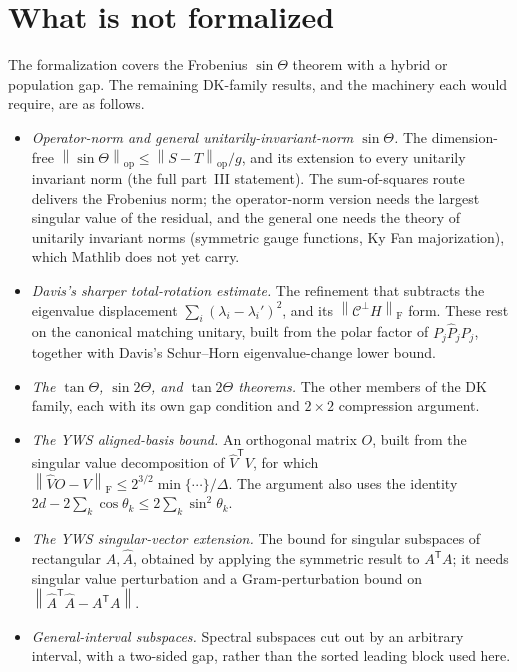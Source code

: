 \documentclass[11pt]{article}
\newcommand{\norm}[1]{\left\lVert #1\right\rVert}
\newcommand{\F}{\mathrm{F}}
\newcommand{\op}{\mathrm{op}}
\newcommand{\gap}{g}
\newcommand{\sinT}{\sin\Theta}
\newcommand{\tp}{^{\mathsf T}}
\theoremstyle{remark}
\begin{document}
\section{What is not formalized}

The formalization covers the Frobenius $\sin\Theta$ theorem with a hybrid or
population gap.  The remaining DK-family results, and the machinery each would
require, are as follows.

\begin{itemize}
\item \emph{Operator-norm and general unitarily-invariant-norm $\sin\Theta$.} The
  dimension-free $\norm{\sinT}_{\op}\le\norm{S-T}_{\op}/\gap$, and its extension
  to every unitarily invariant norm (the full part~III statement).  The
  sum-of-squares route delivers the Frobenius norm; the operator-norm version
  needs the largest singular value of the residual, and the general one needs the
  theory of unitarily invariant norms (symmetric gauge functions, Ky Fan
  majorization), which Mathlib does not yet carry.
\item \emph{Davis's sharper total-rotation estimate.} The refinement that
  subtracts the eigenvalue displacement $\sum_i(\lambda_i-\lambda_i')^2$, and its
  $\norm{\mathcal C^{\perp}H}_{\F}$ form.  These rest on the canonical matching
  unitary, built from the polar factor of $P_j\widehat P_jP_j$, together with
  Davis's Schur--Horn eigenvalue-change lower bound.
\item \emph{The $\tan\Theta$, $\sin2\Theta$, and $\tan2\Theta$ theorems.} The
  other members of the DK family, each with its own gap condition and $2\times2$
  compression argument.
\item \emph{The YWS aligned-basis bound.} An orthogonal matrix $O$, built from the
  singular value decomposition of $\widehat V\tp V$, for which
  $\norm{\widehat V O-V}_{\F}\le 2^{3/2}\min\{\cdots\}/\Delta$.  The argument also
  uses the identity $2d-2\sum_k\cos\theta_k\le 2\sum_k\sin^2\theta_k$.
\item \emph{The YWS singular-vector extension.} The bound for singular subspaces
  of rectangular $A,\widehat A$, obtained by applying the symmetric result to
  $A\tp A$; it needs singular value perturbation and a Gram-perturbation bound on
  $\norm{\widehat A\tp\widehat A-A\tp A}$.
\item \emph{General-interval subspaces.} Spectral subspaces cut out by an
  arbitrary interval, with a two-sided gap, rather than the sorted leading block
  used here.
\end{itemize}
\end{document}
